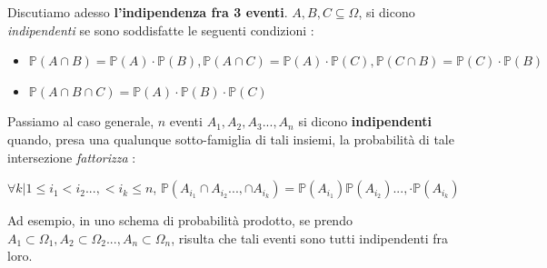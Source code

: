 \documentclass[12pt, letterpaper]{article}
\begin{document}
Discutiamo adesso \textbf{l'indipendenza fra 3 eventi}. \(A,B,C\subseteq\Omega\), si dicono \textit{indipendenti} se
sono soddisfatte le seguenti condizioni :\begin{itemize}
    \item \( \mathbb{P}(A\cap B)=\mathbb{P}(A)\cdot\mathbb{P}(B),\mathbb{P}(A\cap C)=\mathbb{P}(A)\cdot\mathbb{P}(C),\mathbb{P}(C\cap B)=\mathbb{P}(C)\cdot\mathbb{P}(B) \)
    \item \(\mathbb{P}(A\cap B\cap C)=\mathbb{P}(A)\cdot\mathbb{P}(B)\cdot\mathbb{P}(C)\)
\end{itemize}
Passiamo al caso generale, \(n\) eventi \(A_1,A_2,A_3...,A_n\) si dicono \textbf{indipendenti} quando, presa 
una qualunque sotto-famiglia di tali insiemi, la probabilità di tale intersezione \textit{fattorizza} :
\begin{center}
    \(
    \forall k| 1\le i_1 <i_2...,<i_k\le n \), \(
    \mathbb{P}(A_{i_1}\cap A_{i_2}...,\cap A_{i_k})=\mathbb{P}(A_{i_1})\mathbb{P}(A_{i_2})...,\cdot \mathbb{P}(A_{i_k})    \)
    
\end{center}
Ad esempio, in uno schema di probabilità prodotto, se prendo \(A_1\subset\Omega_1,A_2\subset\Omega_2...,A_n\subset\Omega_n\), 
risulta che tali eventi sono tutti indipendenti fra loro.
\end{document}
